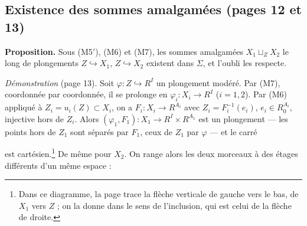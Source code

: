 \documentclass[11pt,a4paper]{article}
\begin{document}
\subsection*{Existence des sommes amalgamées (pages 12 et 13)}

\textbf{Proposition.} Sous (M5$'$), (M6) et (M7), les sommes amalgamées $X_1
\sqcup_Z X_2$ le long de plongements $Z \hookrightarrow X_1$, $Z
\hookrightarrow X_2$ existent dans $\Sigma$, et l'oubli les respecte.

\emph{Démonstration} (page 13). Soit $\varphi : Z \hookrightarrow R^I$ un
plongement modéré. Par (M7), coordonnée par coordonnée, il se prolonge en
$\varphi_i : X_i \to R^I$ ($i = 1, 2$). Par (M6) appliqué à $Z_i = u_i(Z)
\subset X_i$, on a $F_i : X_i \to R^{A_i}$ avec $Z_i = F_i^{-1}(e_i)$, $e_i \in
R_0^{A_i}$, injective hors de $Z_i$. Alors $(\varphi_1, F_1) : X_1 \to R^I
\times R^{A_1}$ est un plongement — les points hors de $Z_1$ sont séparés par
$F_1$, ceux de $Z_1$ par $\varphi$ — et le carré


est cartésien.\footnote{Dans ce diagramme, la page trace la flèche verticale
de gauche vers le bas, de $X_1$ vers $Z$ ; on la donne dans le sens de
l'inclusion, qui est celui de la flèche de droite.} De même pour $X_2$. On
range alors les deux morceaux à des étages différents d'un même espace :

\end{document}
